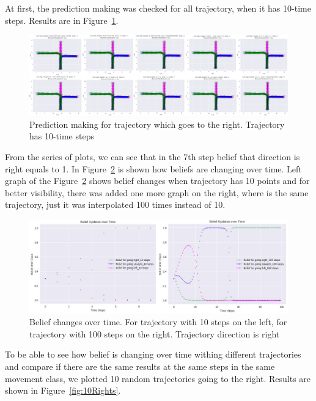 At first, the prediction making was checked for all trajectory, when it has 10-time steps. Results are in Figure~\ref{fig:rightPrediction}. 

\begin{figure}[h]
	\centering  	
	\includegraphics[width=18cm]{img/0_prediction_right.PNG}
	\caption{Prediction making for trajectory which goes to the right. Trajectory has 10-time steps}
	\label{fig:rightPrediction}    
\end{figure}

From the series of plots, we can see that in the 7th step belief that direction is right equals to 1. In Figure~\ref{fig:CompareRight} is shown how beliefs are changing over time. Left graph of the Figure~\ref{fig:CompareRight} shows belief changes when trajectory has 10 points and for better visibility, there was added one more graph on the right, where is the same trajectory, just it was interpolated 100 times instead of 10.

\begin{figure}[h]
	\centering  	
	\includegraphics[width=15cm]{img/10_100_compared_right.jpg}
	\caption{Belief changes over time. For trajectory with 10 steps on the left, for trajectory with 100 steps on the right. Trajectory direction is right}
	\label{fig:CompareRight}    
\end{figure}

To be able to see how belief is changing over time withing different trajectories and compare if there are the same results at the same steps in the same movement class, we plotted 10 random trajectories going to the right. Results are shown in Figure~\ref{fig:10Rights}.

